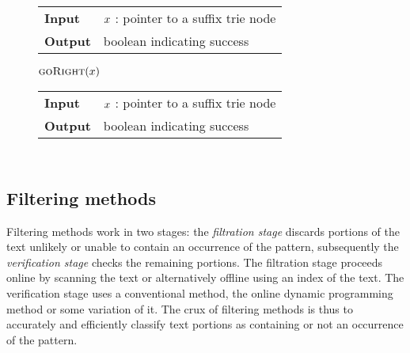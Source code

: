 \begin{figure*}[h]
\begin{minipage}[t]{.5\textwidth}
\begin{algorithm}[H]
\begin{tabular}{ll}
\textbf{Input}  & $x$ : pointer to a suffix trie node\\
\textbf{Output} & boolean indicating success\\
\end{tabular}
\begin{algorithmic}[1]
	\State \Return \False
\EndIf
{}
	\State \Return \True
\Else
	\State \Return $\Call{goRight}{$\Tn$}$		
\EndIf
\end{algorithmic}
\label{alg:st-godown}
\end{algorithm}
\end{minipage}
\hfill
\begin{minipage}[t]{.5\textwidth}
\begin{algorithm}[H]
\begin{tabular}{ll}
\textbf{Input}  & $x$ : pointer to a suffix trie node\\
\textbf{Output} & boolean indicating success\\
\end{tabular}
\begin{algorithmic}[1]
			\State \Return \True
		\EndIf
	\EndWhile
\EndIf
\State \Return \False $\phantom{()}$
\end{algorithmic}
\label{alg:st-goright}
\end{algorithm}
\end{minipage}
\end{figure*}



\subsection{Filtering methods}
\label{sec:intro:filtering}

Filtering methods work in two stages: the \emph{filtration stage} discards portions of the text unlikely or unable to contain an occurrence of the pattern, subsequently the \emph{verification stage} checks the remaining portions.
The filtration stage proceeds online by scanning the text or alternatively offline using an index of the text.
The verification stage uses a conventional method, \eg the online dynamic programming method or some variation of it.
The crux of filtering methods is thus to accurately and efficiently classify text portions as containing or not an occurrence of the pattern.


